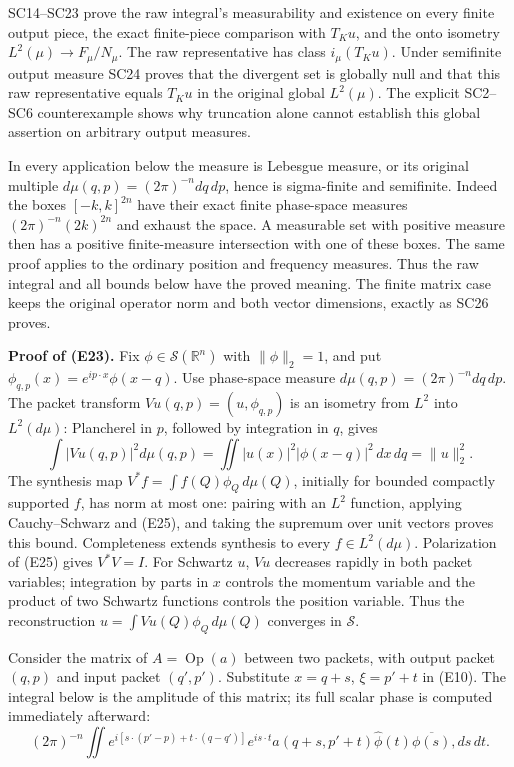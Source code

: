 \documentclass[
  11pt,
]{article}
\begin{document}
SC14--SC23 prove the raw integral's measurability and existence on every
finite output piece, the exact finite-piece comparison with \(T_Ku\),
and the onto isometry \(L^2(\mu)\to F_\mu/N_\mu\). The raw
representative has class \(i_\mu(T_Ku)\). Under semifinite output
measure SC24 proves that the divergent set is globally null and that
this raw representative equals \(T_Ku\) in the original global
\(L^2(\mu)\). The explicit SC2--SC6 counterexample shows why truncation
alone cannot establish this global assertion on arbitrary output
measures.

In every application below the measure is Lebesgue measure, or its
original multiple \(d\mu(q,p)=(2\pi)^{-n}dq\,dp\), hence is sigma-finite
and semifinite. Indeed the boxes \([-k,k]^{2n}\) have their exact finite
phase-space measures \((2\pi)^{-n}(2k)^{2n}\) and exhaust the space. A
measurable set with positive measure then has a positive finite-measure
intersection with one of these boxes. The same proof applies to the
ordinary position and frequency measures. Thus the raw integral and all
bounds below have the proved meaning. The finite matrix case keeps the
original operator norm and both vector dimensions, exactly as SC26
proves.

\textbf{Proof of (E23).} Fix \(\phi\in\mathcal S(\mathbb R^n)\) with
\(\|\phi\|_2=1\), and put \(\phi_{q,p}(x)=e^{ip\cdot x}\phi(x-q)\). Use
phase-space measure \(d\mu(q,p)=(2\pi)^{-n}dq\,dp\). The packet
transform \(Vu(q,p)=(u,\phi_{q,p})\) is an isometry from \(L^2\) into
\(L^2(d\mu)\): Plancherel in \(p\), followed by integration in \(q\),
gives \[
\int|Vu(q,p)|^2d\mu(q,p)
=\iint |u(x)|^2|\phi(x-q)|^2\,dx\,dq=\|u\|_2^2.
\tag{E25}
\] The synthesis map \(V^*f=\int f(Q)\phi_Q\,d\mu(Q)\), initially for
bounded compactly supported \(f\), has norm at most one: pairing with an
\(L^2\) function, applying Cauchy--Schwarz and (E25), and taking the
supremum over unit vectors proves this bound. Completeness extends
synthesis to every \(f\in L^2(d\mu)\). Polarization of (E25) gives
\(V^*V=I\). For Schwartz \(u\), \(Vu\) decreases rapidly in both packet
variables; integration by parts in \(x\) controls the momentum variable
and the product of two Schwartz functions controls the position
variable. Thus the reconstruction \(u=\int Vu(Q)\phi_Q\,d\mu(Q)\)
converges in \(\mathcal S\).

Consider the matrix of \(A=\operatorname{Op}(a)\) between two packets,
with output packet \((q,p)\) and input packet \((q',p')\). Substitute
\(x=q+s\), \(\xi=p'+t\) in (E10). The integral below is the amplitude of
this matrix; its full scalar phase is computed immediately afterward: \[
(2\pi)^{-n}\iint
e^{i[s\cdot(p'-p)+t\cdot(q-q')]}
e^{is\cdot t}a(q+s,p'+t)\widehat\phi(t)\overline{\phi(s)},ds\,dt.
\tag{E26}
\]
\end{document}
